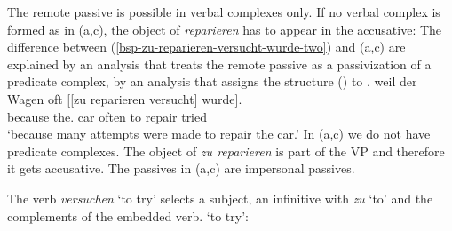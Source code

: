 The remote passive is possible in verbal complexes only. If no verbal complex is formed as in
(a,c), the object of \emph{reparieren} has to appear in the accusative:
\eal
{}
\zl
The difference between (\ref{bsp-zu-reparieren-versucht-wurde-two}) and (a,c) are explained by an analysis that treats the remote passive as a passivization
of a predicate complex, \ie by an analysis that assigns the structure () to .
\ea
\gll weil    der        Wagen oft   [[zu reparieren versucht] wurde].\\
     because the.\NOM{} car   often \hphantom{[[}to repair   tried     \AUX\\
\glt `because many attempts were made to repair the car.'\label{bsp-zu-reparieren-versucht-wurde-three}
%
\z
In (a,c) we do not have predicate complexes. The object of \emph{zu reparieren} is part of the VP
and therefore it gets accusative. The passives in (a,c) are impersonal passives.


The verb \emph{versuchen} `to try' selects a subject, an infinitive with \emph{zu} `to' and the
complements of the embedded verb.
\ea
{} `to try':\\
\z

